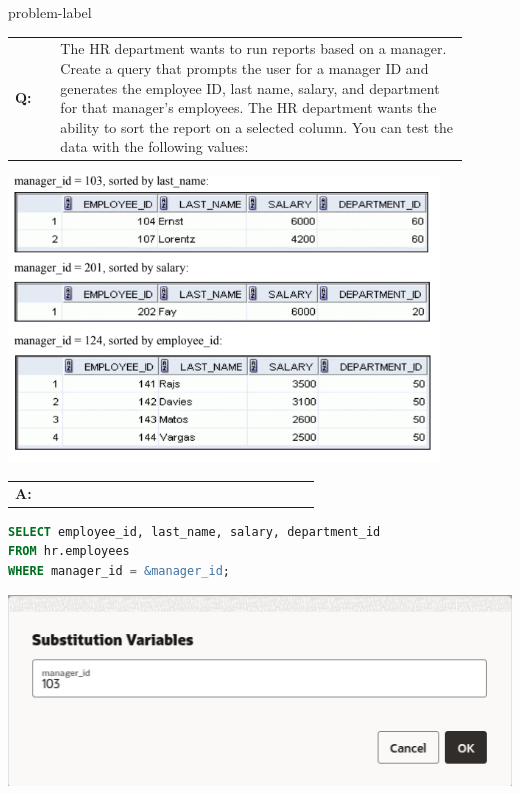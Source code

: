 \begin{problem}{}{problem-label}

\begin{tabular}{@{}l p{0.9\linewidth}@{}}
  \textbf{Q:} & The HR department wants to run reports based on a manager. Create a query that prompts the user for a manager ID and generates the employee ID, last name, salary, and department for that manager’s employees. The HR department wants the ability to sort the report on a selected column. You can test the data with the following values:
\end{tabular}

\begin{center}
  \includegraphics[scale=0.8]{images/c2q11.png}
\end{center}

\begin{tabular}{@{}l p{0.9\linewidth}@{}}
  \textbf{A:} & 
\end{tabular}

\begin{lstlisting}[language=SQL]
SELECT employee_id, last_name, salary, department_id
FROM hr.employees
WHERE manager_id = &manager_id;
\end{lstlisting}

\vspace{1em}

\begin{center}
  \includegraphics[scale=0.5]{images/c2a11-1.png}
\end{center}


\end{problem}

